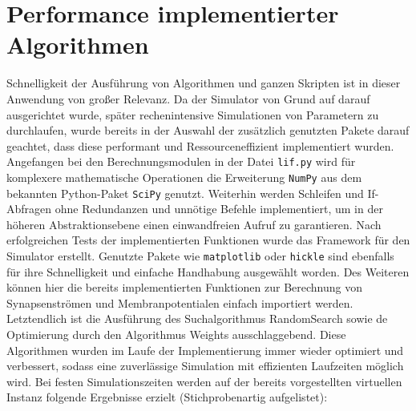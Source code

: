 \section{Performance implementierter Algorithmen}
\label{sec:erg_performance}
	Schnelligkeit der Ausführung von Algorithmen und ganzen Skripten ist in dieser Anwendung von großer Relevanz. Da der Simulator von Grund auf darauf ausgerichtet wurde, später rechenintensive Simulationen von Parametern zu durchlaufen, wurde bereits in der Auswahl der zusätzlich genutzten Pakete darauf geachtet, dass diese performant und Ressourceneffizient implementiert wurden.\\
	Angefangen bei den Berechnungsmodulen in der Datei \texttt{lif.py} wird für komplexere mathematische Operationen die Erweiterung \texttt{NumPy} \cite{NumPy} aus dem bekannten Python-Paket \texttt{SciPy} \cite{NumPy} genutzt. Weiterhin werden Schleifen und If-Abfragen ohne Redundanzen und unnötige Befehle implementiert, um in der höheren Abstraktionsebene einen einwandfreien Aufruf zu garantieren. Nach erfolgreichen Tests der implementierten Funktionen wurde das Framework für den Simulator erstellt. Genutzte Pakete wie \texttt{matplotlib} \cite{Hunter2007} oder \texttt{hickle} \cite{hdf5} sind ebenfalls für ihre Schnelligkeit und einfache Handhabung ausgewählt worden. Des Weiteren können hier die bereits implementierten Funktionen zur Berechnung von Synapsenströmen und Membranpotentialen einfach importiert werden.\\
	Letztendlich ist die Ausführung des Suchalgorithmus RandomSearch sowie de Optimierung durch den Algorithmus Weights ausschlaggebend. Diese Algorithmen wurden im Laufe der Implementierung immer wieder optimiert und verbessert, sodass eine zuverlässige Simulation mit effizienten Laufzeiten möglich wird. Bei festen Simulationszeiten werden auf der bereits vorgestellten virtuellen Instanz folgende Ergebnisse erzielt (Stichprobenartig aufgelistet):
	\begin{table}[H]
		\centering
	\caption{Parametersuche durch Algorithmus \texttt{RandomSearch}.}
	\label{tab:sim_rs}
	\end{table}
